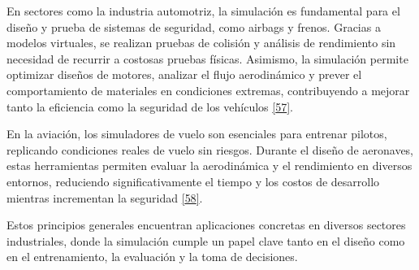 \documentclass[12pt,oneside]{templates/unerthesis}
\begin{document}
En sectores como la industria automotriz, la simulación es fundamental para el diseño y prueba de sistemas de seguridad, como airbags y frenos. Gracias a modelos virtuales, se realizan pruebas de colisión y análisis de rendimiento sin necesidad de recurrir a costosas pruebas físicas. Asimismo, la simulación permite optimizar diseños de motores, analizar el flujo aerodinámico y prever el comportamiento de materiales en condiciones extremas, contribuyendo a mejorar tanto la eficiencia como la seguridad de los vehículos \protect\hyperlink{ref-stork_towards_2008}{{[}57{]}}.

En la aviación, los simuladores de vuelo son esenciales para entrenar pilotos, replicando condiciones reales de vuelo sin riesgos. Durante el diseño de aeronaves, estas herramientas permiten evaluar la aerodinámica y el rendimiento en diversos entornos, reduciendo significativamente el tiempo y los costos de desarrollo mientras incrementan la seguridad \protect\hyperlink{ref-jentsch_simulation_2017}{{[}58{]}}.

Estos principios generales encuentran aplicaciones concretas en diversos sectores industriales, donde la simulación cumple un papel clave tanto en el diseño como en el entrenamiento, la evaluación y la toma de decisiones.

\begin{table}[!h]
\centering
\caption{\label{tab:unnamed-chunk-2}Aplicaciones de la simulación en distintos sectores}
\centering
{}
\end{table}
\end{document}
